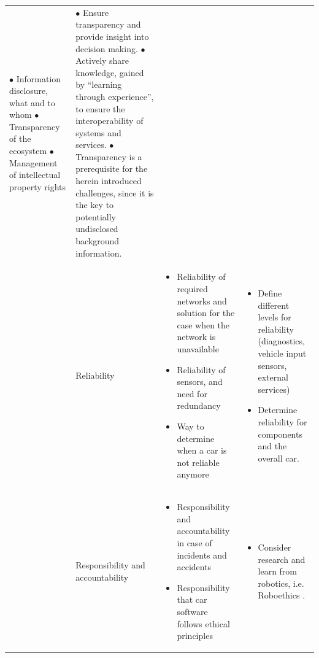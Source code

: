 \begin{table}
\begin{small}
\begin{supertabular}{>{}p{.02\textwidth}|>{\raggedright}p{.105\textwidth}>{\raggedright}p{.4\textwidth}>{\raggedright}p{.4\textwidth}}
				\noindent $\bullet$ Information disclosure, what and to whom
				\noindent $\bullet$ Transparency of the ecosystem
				\noindent $\bullet$ Management of intellectual property rights
			& 
				\noindent $\bullet$ Ensure transparency and provide insight into decision making.
				\noindent $\bullet$ Actively share knowledge, gained by \enquote{learning through experience}, to ensure the interoperability of systems and services.
				\noindent $\bullet$ Transparency is a prerequisite for the herein introduced challenges, since it is the key to potentially undisclosed background information.
 			 \tabularnewline {}
			& Reliability & 
				\begin{itemize}
					\item Reliability of required networks and solution for the case when the network is unavailable
					\item Reliability of sensors, and need for redundancy
					\item Way to determine when a car is not reliable anymore
				\end{itemize}	
			& 
				\begin{itemize}
					\item Define different levels for reliability (diagnostics, vehicle input sensors, external services)
					\item Determine reliability for components and the overall car. 
				\end{itemize}
 			 \tabularnewline {}
			& Responsibility and accountability & 
				\begin{itemize}
					\item Responsibility and accountability in case of incidents and accidents
					\item Responsibility that car software follows ethical principles
				\end{itemize}
			& 
				\begin{itemize}
					\item Consider research and learn from robotics, i.e. Roboethics \cite{Dodig-Crnkovic:2008:SMR:1566864.1566888}.

\end{itemize}
\end{supertabular}
\end{small}
\end{table}
